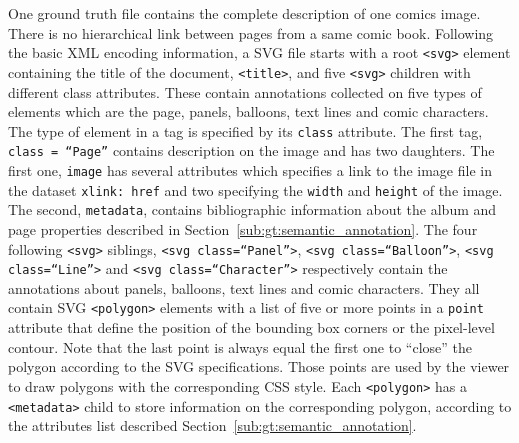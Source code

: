 One ground truth file contains the complete description of one comics image. 
There is no hierarchical link between pages from a same comic book. 
Following the basic XML encoding information, a SVG file starts with a root \texttt{<svg>} element containing the title of the document, \texttt{<title>}, and five \texttt{<svg>} children with different class attributes.
These contain annotations collected on five types of elements which are the page, panels, balloons, text lines and comic characters.
The type of element in a tag is specified by its \texttt{class} attribute.
The first tag, \texttt{class = ``Page''} contains description on the image and has two daughters.
The first one, \texttt{image} has several attributes which specifies a link to the image file in the dataset \texttt{xlink: href} and two specifying the \texttt{width} and \texttt{height} of the image.
The second, \texttt{metadata}, contains bibliographic information about the album and page properties described in Section~\ref{sub:gt:semantic_annotation}.
The four following \texttt{<svg>} siblings, \texttt{<svg class=``Panel''>}, \texttt{<svg class=``Balloon''>}, \texttt{<svg class=``Line''>} and \texttt{<svg class=``Character''>} respectively contain the annotations about panels, balloons, text lines and comic characters. 
They all contain SVG \texttt{<polygon>} elements with a list of five or more points in a \texttt{point} attribute that define the position of the bounding box corners or the pixel-level contour. %
Note that the last point is always equal the first one to ``close'' the polygon according to the SVG specifications. 
Those points are used by the viewer to draw polygons with the corresponding CSS style. 
Each \texttt{<polygon>} has a \texttt{<metadata>} child to store information on the corresponding polygon, according to the attributes list described Section~\ref{sub:gt:semantic_annotation}.


